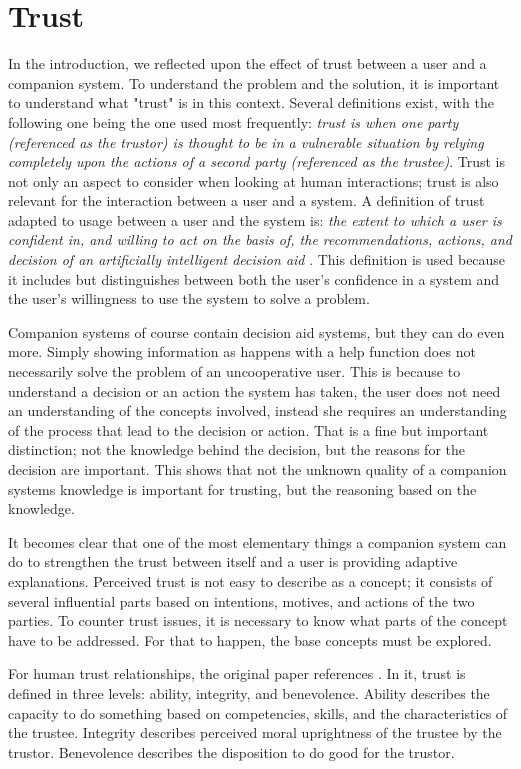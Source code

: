 \documentclass[a4paper]{article}
\begin{document}
\newpage
\section{Trust}

In the introduction, we reflected upon the effect of trust between a user and a companion system. To understand the problem and the solution, it is important to understand what "trust" is in this context. Several definitions exist, with the following one being the one used most frequently: {\it trust is when one party (referenced as the trustor) is thought to be in a vulnerable situation by relying completely upon the actions of a second party (referenced as the trustee)}. Trust is not only an aspect to consider when looking at human interactions; trust is also relevant for the interaction between a user and a system. A definition of trust adapted to usage between a user and the system is: {\it the extent to which a user is confident in, and willing to act on the basis of, the recommendations, actions, and decision of an artificially intelligent decision aid} \cite{htc}. This definition is used because it includes but distinguishes between both the user's confidence in a system and the user's willingness to use the system to solve a problem.

Companion systems of course contain decision aid systems, but they can do even more. Simply showing information as happens with a help function does not necessarily solve the problem of an uncooperative user. This is because to understand a decision or an action the system has taken, the user does not need an understanding of the concepts involved, instead she requires an understanding of the process that lead to the decision or action. That is a fine but important distinction; not the knowledge behind the decision, but the reasons for the decision are important. This shows that not the unknown quality of a companion systems knowledge is important for trusting, but the reasoning based on the knowledge.

It becomes clear that one of the most elementary things a companion system can do to strengthen the trust between itself and a user is providing adaptive explanations. Perceived trust is not easy to describe as a concept; it consists of several influential parts based on intentions, motives, and actions of the two parties. To counter trust issues, it is necessary to know what parts of the concept have to be addressed. For that to happen, the base concepts must be explored.

For human trust relationships, the original paper references \cite{htc}. In it, trust is defined in three levels: ability, integrity, and benevolence. Ability describes the capacity to do something based on competencies, skills, and the characteristics of the trustee. Integrity describes perceived moral uprightness of the trustee by the trustor. Benevolence describes the disposition to do good for the trustor.
\end{document}
